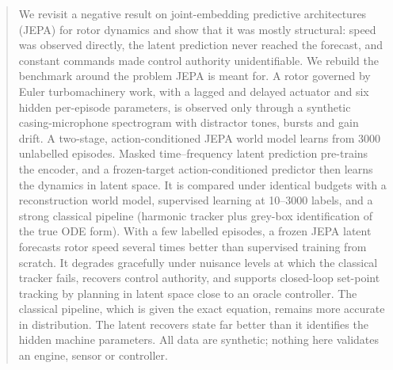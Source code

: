 \begin{abstract}
We revisit a negative result on joint-embedding predictive architectures (JEPA) for rotor dynamics and show that it was mostly structural: speed was observed directly, the latent prediction never reached the forecast, and constant commands made control authority unidentifiable. We rebuild the benchmark around the problem JEPA is meant for. A rotor governed by Euler turbomachinery work, with a lagged and delayed actuator and six hidden per-episode parameters, is observed only through a synthetic casing-microphone spectrogram with distractor tones, bursts and gain drift. A two-stage, action-conditioned JEPA world model learns from 3000 unlabelled episodes. Masked time--frequency latent prediction pre-trains the encoder, and a frozen-target action-conditioned predictor then learns the dynamics in latent space. It is compared under identical budgets with a reconstruction world model, supervised learning at 10--3000 labels, and a strong classical pipeline (harmonic tracker plus grey-box identification of the true ODE form). With a few labelled episodes, a frozen JEPA latent forecasts rotor speed several times better than supervised training from scratch. It degrades gracefully under nuisance levels at which the classical tracker fails, recovers control authority, and supports closed-loop set-point tracking by planning in latent space close to an oracle controller. The classical pipeline, which is given the exact equation, remains more accurate in distribution. The latent recovers state far better than it identifies the hidden machine parameters. All data are synthetic; nothing here validates an engine, sensor or controller.
\end{abstract}
